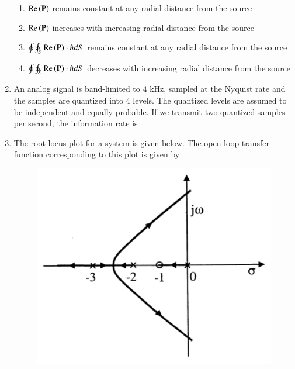 \documentclass[a4paper, 11pt]{article}
\begin{document}
\begin{enumerate}
    \begin{enumerate}
        \item $\text{Re}\left(\mathbf{P}\right)$ remains constant at any radial distance from the source
        \item $\text{Re}\left(\mathbf{P}\right)$ increases with increasing radial distance from the source
        \item $\oint\oint_{S}\text{Re}\left(\mathbf{P}\right) \cdot \hat{n} dS$ remains constant at any radial distance from the source
        \item $\oint\oint_{S}\text{Re}\left(\mathbf{P}\right) \cdot \hat{n} dS$ decreases with increasing radial distance from the source
    \end{enumerate}

    \hfill{}

    \item An analog signal is band-limited to $4$ kHz, sampled at the Nyquist rate and the samples are quantized into $4$ levels. The quantized levels are assumed to be independent and equally probable. If we transmit two quantized samples per second, the information rate is
    
    \begin{enumerate}
    \end{enumerate}
    
    \hfill{}

    \item The root locus plot for a system is given below. The open loop transfer function corresponding to this plot is given by
    
    \begin{figure}[H]
        \centering
        \includegraphics[width=0.6\columnwidth]{figs/q16.png}
        \caption*{}
        \label{fig:q16}
    \end{figure}
    

\end{enumerate}
\end{document}
